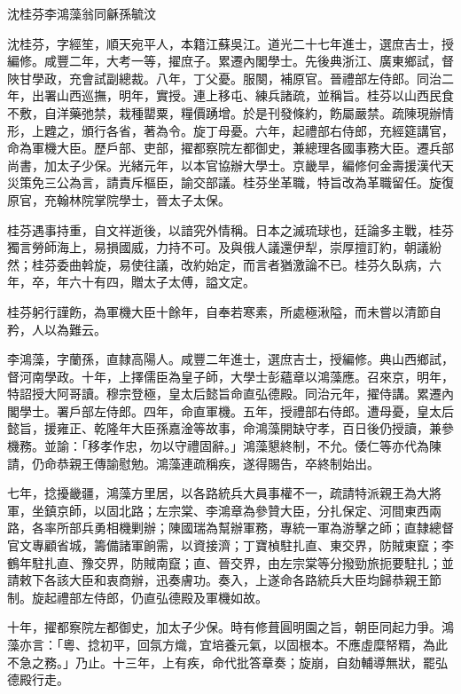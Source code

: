 
\begin{pinyinscope}
沈桂芬李鴻藻翁同龢孫毓汶

沈桂芬，字經笙，順天宛平人，本籍江蘇吳江。道光二十七年進士，選庶吉士，授編修。咸豐二年，大考一等，擢庶子。累遷內閣學士。先後典浙江、廣東鄉試，督陜甘學政，充會試副總裁。八年，丁父憂。服闋，補原官。晉禮部左侍郎。同治二年，出署山西巡撫，明年，實授。連上移屯、練兵諸疏，並稱旨。桂芬以山西民食不敷，自洋藥弛禁，栽種罌粟，糧價踴增。於是刊發條約，飭屬嚴禁。疏陳現辦情形，上韙之，頒行各省，著為令。旋丁母憂。六年，起禮部右侍郎，充經筵講官，命為軍機大臣。歷戶部、吏部，擢都察院左都御史，兼總理各國事務大臣。遷兵部尚書，加太子少保。光緒元年，以本官協辦大學士。京畿旱，編修何金壽援漢代天災策免三公為言，請責斥樞臣，諭交部議。桂芬坐革職，特旨改為革職留任。旋復原官，充翰林院掌院學士，晉太子太保。

桂芬遇事持重，自文祥逝後，以諳究外情稱。日本之滅琉球也，廷論多主戰，桂芬獨言勞師海上，易損國威，力持不可。及與俄人議還伊犁，崇厚擅訂約，朝議紛然；桂芬委曲斡旋，易使往議，改約始定，而言者猶激論不已。桂芬久臥病，六年，卒，年六十有四，贈太子太傅，謚文定。

桂芬躬行謹飭，為軍機大臣十餘年，自奉若寒素，所處極湫隘，而未嘗以清節自矜，人以為難云。

李鴻藻，字蘭孫，直隸高陽人。咸豐二年進士，選庶吉士，授編修。典山西鄉試，督河南學政。十年，上擇儒臣為皇子師，大學士彭蘊章以鴻藻應。召來京，明年，特詔授大阿哥讀。穆宗登極，皇太后懿旨命直弘德殿。同治元年，擢侍講。累遷內閣學士。署戶部左侍郎。四年，命直軍機。五年，授禮部右侍郎。遭母憂，皇太后懿旨，援雍正、乾隆年大臣孫嘉淦等故事，命鴻藻開缺守孝，百日後仍授讀，兼參機務。並諭：「移孝作忠，勿以守禮固辭。」鴻藻懇終制，不允。倭仁等亦代為陳請，仍命恭親王傳諭慰勉。鴻藻連疏稱疾，遂得賜告，卒終制始出。

七年，捻擾畿疆，鴻藻方里居，以各路統兵大員事權不一，疏請特派親王為大將軍，坐鎮京師，以固北路；左宗棠、李鴻章為參贊大臣，分扎保定、河間東西兩路，各率所部兵勇相機剿辦；陳國瑞為幫辦軍務，專統一軍為游擊之師；直隸總督官文專顧省城，籌備諸軍餉需，以資接濟；丁寶楨駐扎直、東交界，防賊東竄；李鶴年駐扎直、豫交界，防賊南竄；直、晉交界，由左宗棠等分撥勁旅扼要駐扎；並請敕下各該大臣和衷商辦，迅奏膚功。奏入，上遂命各路統兵大臣均歸恭親王節制。旋起禮部左侍郎，仍直弘德殿及軍機如故。

十年，擢都察院左都御史，加太子少保。時有修葺圓明園之旨，朝臣同起力爭。鴻藻亦言：「粵、捻初平，回氛方熾，宜培養元氣，以固根本。不應虛糜帑糈，為此不急之務。」乃止。十三年，上有疾，命代批答章奏；旋崩，自劾輔導無狀，罷弘德殿行走。


\end{pinyinscope}
